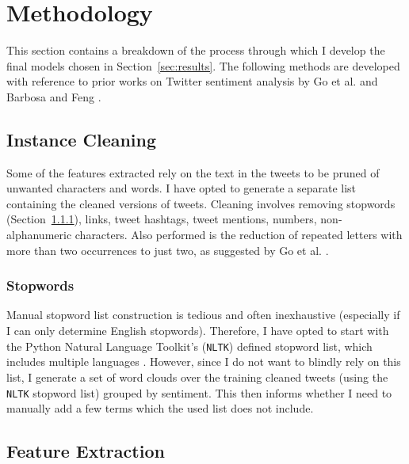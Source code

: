 \documentclass[11pt]{article}
\begin{document}
\section{Methodology}

This section contains a breakdown of the process through which I develop the final models chosen in Section~\ref{sec:results}.
The following methods are developed with reference to prior works on {T}witter sentiment analysis by Go et al.  and Barbosa and Feng .

\subsection{Instance Cleaning}

Some of the features extracted rely on the text in the tweets to be pruned of unwanted characters and words.
I have opted to generate a separate list containing the cleaned versions of tweets.
Cleaning involves removing stopwords (Section~\ref{sec:stopwords}), links, tweet hashtags, tweet mentions, numbers, non-alphanumeric characters.
Also performed is the reduction of repeated letters with more than two occurrences to just two, as suggested by Go et al. .

\subsubsection{Stopwords}\label{sec:stopwords}

Manual stopword list construction is tedious and often inexhaustive (especially if I can only determine English stopwords). 
Therefore, I have opted to start with the {P}ython Natural Language Toolkit's (\texttt{NLTK}) defined stopword list, which includes multiple languages \cite{nltk}.
However, since I do not want to blindly rely on this list, 
I generate a set of word clouds over the training cleaned tweets (using the \texttt{NLTK} stopword list) grouped by sentiment.
This then informs whether I need to manually add a few terms which the used list does not include.

\subsection{Feature Extraction}
\end{document}
